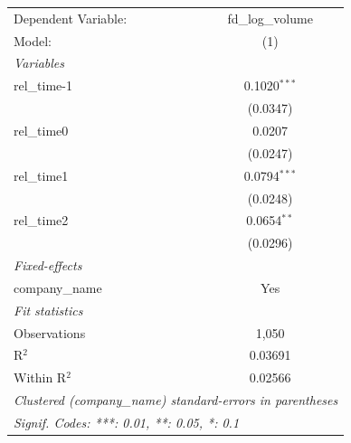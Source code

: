
\begingroup
\centering
\begin{tabular}{lc}
   \tabularnewline \midrule \midrule
   Dependent Variable: & fd\_log\_volume\\    
   Model:              & (1)\\  
   \midrule
   \emph{Variables}\\
   rel\_time-1         & 0.1020$^{***}$\\   
                       & (0.0347)\\   
   rel\_time0          & 0.0207\\   
                       & (0.0247)\\   
   rel\_time1          & 0.0794$^{***}$\\   
                       & (0.0248)\\   
   rel\_time2          & 0.0654$^{**}$\\   
                       & (0.0296)\\   
   \midrule
   \emph{Fixed-effects}\\
   company\_name       & Yes\\  
   \midrule
   \emph{Fit statistics}\\
   Observations        & 1,050\\  
   R$^2$               & 0.03691\\  
   Within R$^2$        & 0.02566\\  
   \midrule \midrule
   \multicolumn{2}{l}{\emph{Clustered (company\_name) standard-errors in parentheses}}\\
   \multicolumn{2}{l}{\emph{Signif. Codes: ***: 0.01, **: 0.05, *: 0.1}}\\
\end{tabular}
\par\endgroup


